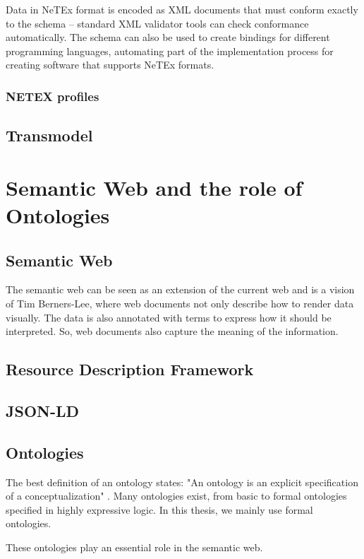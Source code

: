 Data in NeTEx format is encoded as XML documents that must conform exactly to the schema – standard XML validator tools can check conformance automatically. The schema can also be used to create bindings for different
programming languages, automating part of the implementation process for creating software that supports NeTEx
formats. 
\subsubsection{NETEX profiles}
\subsection{Transmodel}
\section{Semantic Web and the role of Ontologies}\label{section:ontologies_rel_work}
\subsection{Semantic Web}
The semantic web can be seen as an extension of the current web and is a vision of Tim Berners-Lee, where web documents not only describe how to render data visually. The data is also annotated with terms to express how it should be interpreted. So, web documents also capture the meaning of the information.
\subsection{Resource Description Framework}
\subsection{JSON-LD}

\subsection{Ontologies}
The best definition of an ontology states: "An ontology is an explicit specification of a conceptualization" \cite{gruber_translation_1993}. Many ontologies exist, from basic to formal ontologies specified in highly expressive logic. In this thesis, we mainly use formal ontologies.

These ontologies play an essential role in the semantic web. 

